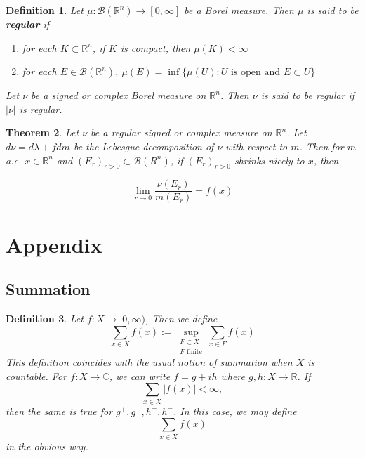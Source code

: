 \documentclass[12pt]{amsart}
\newtheorem{thm}{Theorem}[section]
\newtheorem{defn}[thm]{Definition}
\newcommand{\lam}{\lambda}
\newcommand{\C}{\mathbb{C}}
\newcommand{\R}{\mathbb{R}}
\newcommand{\MB}{\mathcal{B}}
\newcommand{\RG}{[0,\infty]}
\newcommand{\Rg}{[0,\infty)}
\begin{document}
\begin{defn}
Let $\mu:\MB(\R^n) \rightarrow \RG$ be a Borel measure. Then $\mu$ is said to be \textbf{regular} if 
\begin{enumerate}
\item for each $K \subset \R^n$, if $K$ is compact, then $\mu(K)< \infty$
\item for each $E \in \MB(\R^n)$, $\mu(E) = \inf \{\mu(U): U \text{ is open and }E \subset U\}$
\end{enumerate}

Let $\nu$ be a signed or complex Borel measure on $\R^n$. Then $\nu$ is said to be regular if $|\nu|$ is regular.
\end{defn}

\begin{thm}
Let $\nu$ be a regular signed or complex measure on $\R^n$. Let $d\nu = d\lam + f dm$ be the Lebesgue decomposition of $\nu$ with respect to $m$. Then for $m$-a.e. $x \in \R^n$ and $(E_r)_{r >0} \subset \MB(R^n)$, if $(E_r)_{r >0}$ shrinks nicely to $x$, then 

$$\lim_{r \rightarrow 0} \frac{\nu(E_r)}{m(E_r)} = f(x)$$
\end{thm}


\section{Appendix}

\subsection{Summation}

\begin{defn}
Let $f:X \rightarrow \Rg$, Then we define $$\sum_{x \in X} f(x) := \sup_{\substack{F \subset X \\ F \text{ finite}}} \sum_{x \in F} f(x)$$ This definition coincides with the usual notion of summation when $X$ is countable. For $f:X \rightarrow \C$, we can write $f = g +ih$ where $g,h:X \rightarrow \R$. If $$\sum_{x \in X}|f(x)| < \infty,$$ then the same is true for $g^+,g^-,h^+,h^-$. In this case, we may define $$\sum_{x \in X} f(x)$$ in the obvious way.
\end{defn}
\end{document}
